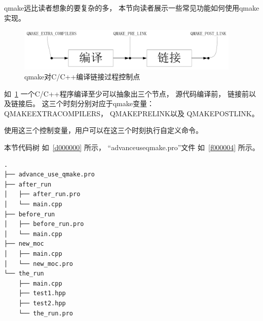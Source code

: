 qmake远比读者想象的要复杂的多，
本节向读者展示一些常见功能如何使用qmake实现。

\begin{figure}[htb] %
\marginnote{\fbox{\footnotesize{\figurename\ \ref{p000002}}}}\centering %
\includegraphics[width=0.95\textwidth]{chapter01/images/advance_use_qmake.png} %
\caption{qmake对C/C{\sourcefonttwo{}+}{\sourcefonttwo{}+}编译链接过程控制点} %
\label{p000002} %
\end{figure}


如\figurename\ \ref{p000002}
一个C/C{\sourcefonttwo{}+}{\sourcefonttwo{}+}程序编译至少可以抽象出三个节点，
源代码编译前，
链接前以及链接后。
这三个时刻分别对应于qmake变量：
QMAKE\underline{\hspace{0.5em}}EXTRA\underline{\hspace{0.5em}}COMPILERS，
QMAKE\underline{\hspace{0.5em}}PRE\underline{\hspace{0.5em}}LINK以及
QMAKE\underline{\hspace{0.5em}}POST\underline{\hspace{0.5em}}LINK。

使用这三个控制变量，用户可以在这三个时刻执行自定义命令。

本节代码树
如\treeindexnumbernameone\ \ref{d000000}
所示，
“advance\underline{\hspace{0.5em}}use\underline{\hspace{0.5em}}qmake.pro”文件
如\lstlistingname\ \ref{f000004}
所示。

\FloatBarrier
{}\label{d000000}    %
\begin{lstlisting}[caption=GoodLuck,
numbers=none,
title=\treeindexnumbernameone\ \thetreeindexnumber
]
.
├── advance_use_qmake.pro
├── after_run
│   ├── after_run.pro
│   └── main.cpp
├── before_run
│   ├── before_run.pro
│   └── main.cpp
├── new_moc
│   ├── main.cpp
│   └── new_moc.pro
└── the_run
    ├── main.cpp
    ├── test1.hpp
    ├── test2.hpp
    └── the_run.pro
\end{lstlisting}          %
\marginpar{\raisebox{1.65ex}{\fbox{\footnotesize{\treeindexnumbernameone\ \thetreeindexnumber}}}} %

